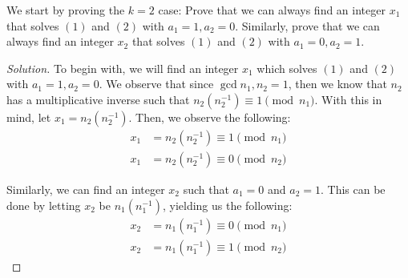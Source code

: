 \documentclass{article}
\newenvironment{solution}{\begin{proof}[Solution]}{\end{proof}}
\begin{document}
\begin{hw}
	We start by proving the $k=2$ case: Prove that we can always find an integer $x_1$
	that solves $(1)$ and $(2)$ with $a_1 = 1, a_2 = 0$. Similarly, prove that we can always
	find an integer $x_2$ that solves $(1)$ and $(2)$ with $a_1 = 0, a_2 = 1$.
\end{hw}
\begin{solution}
	To begin with, we will find an integer $x_{1}$ which solves $(1)$ and $(2)$ with $a_{1} = 1, a_{2} = 0$. We observe that since $\gcd{n_{1}, n_{2}} = 1$, then we know that $n_{2}$ has a multiplicative inverse such that $n_{2}(n_{2}^{-1}) \equiv 1 \pmod{n_{1}}$. With this in mind, let $x_{1} = n_{2}(n_{2}^{-1})$. Then, we observe the following:
	\begin{align*}
		x_{1} &= n_{2}(n^{-1}_{2}) \equiv 1 \pmod{n_{1}} \\
		x_{1} &= n_{2}(n_{2}^{-1}) \equiv 0 \pmod{n_{2}}
	\end{align*}

	Similarly, we can find an integer $x_{2}$ such that $a_{1}=0$ and $a_{2} = 1$. This can be done by letting $x_{2}$ be $n_{1}(n_{1}^{-1})$, yielding us the following:
	\begin{align*}
		x_{2} &= n_{1}(n_{1}^{-1}) \equiv 0 \pmod{n_{1}} \\
		x_{2} &= n_{1}(n_{1}^{-1}) \equiv 1 \pmod{n_{2}}
	\end{align*}
\end{solution}
\end{document}
